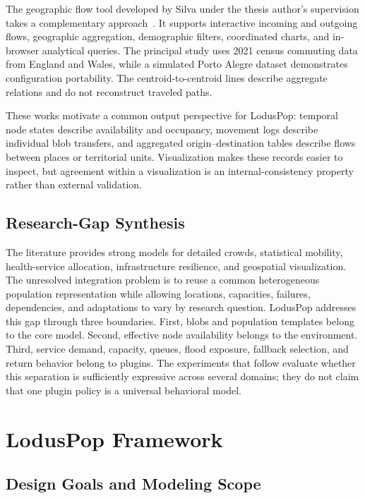 \documentclass[pdflatex,sn-mathphys-num]{sn-jnl}%
\theoremstyle{thmstyleone}%
\theoremstyle{thmstyletwo}%
\theoremstyle{thmstylethree}%
\begin{document}
The geographic flow tool developed by Silva under the thesis author's supervision takes a complementary approach~\citep{silva2026geospatial}. It supports interactive incoming and outgoing flows, geographic aggregation, demographic filters, coordinated charts, and in-browser analytical queries. The principal study uses 2021 census commuting data from England and Wales, while a simulated Porto Alegre dataset demonstrates configuration portability. The centroid-to-centroid lines describe aggregate relations and do not reconstruct traveled paths.

These works motivate a common output perspective for LodusPop: temporal node states describe availability and occupancy, movement logs describe individual blob transfers, and aggregated origin--destination tables describe flows between places or territorial units. Visualization makes these records easier to inspect, but agreement within a visualization is an internal-consistency property rather than external validation.

\subsection{Research-Gap Synthesis}
\label{related:synthesis}

The literature provides strong models for detailed crowds, statistical mobility, health-service allocation, infrastructure resilience, and geospatial visualization. The unresolved integration problem is to reuse a common heterogeneous population representation while allowing locations, capacities, failures, dependencies, and adaptations to vary by research question. LodusPop addresses this gap through three boundaries. First, blobs and population templates belong to the core model. Second, effective node availability belongs to the environment. Third, service demand, capacity, queues, flood exposure, fallback selection, and return behavior belong to plugins. The experiments that follow evaluate whether this separation is sufficiently expressive across several domains; they do not claim that one plugin policy is a universal behavioral model.

\section{LodusPop Framework}
\label{sec:proposed_model}

\subsection{Design Goals and Modeling Scope}
\end{document}
